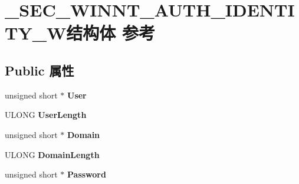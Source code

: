 \hypertarget{struct___s_e_c___w_i_n_n_t___a_u_t_h___i_d_e_n_t_i_t_y___w}{}\section{\+\_\+\+S\+E\+C\+\_\+\+W\+I\+N\+N\+T\+\_\+\+A\+U\+T\+H\+\_\+\+I\+D\+E\+N\+T\+I\+T\+Y\+\_\+\+W结构体 参考}
\label{struct___s_e_c___w_i_n_n_t___a_u_t_h___i_d_e_n_t_i_t_y___w}
\subsection*{Public 属性}
\begin{DoxyCompactItemize}
\item 
\mbox{\label{struct___s_e_c___w_i_n_n_t___a_u_t_h___i_d_e_n_t_i_t_y___w_a8e8608657aa4cf4a42331ae98327e2c1}} 
unsigned short $\ast$ {\bfseries User}
\item 
\mbox{\label{struct___s_e_c___w_i_n_n_t___a_u_t_h___i_d_e_n_t_i_t_y___w_ae8c6f43df6912c76859a0844bc79f59f}} 
U\+L\+O\+NG {\bfseries User\+Length}
\item 
\mbox{\label{struct___s_e_c___w_i_n_n_t___a_u_t_h___i_d_e_n_t_i_t_y___w_a65a44c50b18886d138eb0b67b88473b5}} 
unsigned short $\ast$ {\bfseries Domain}
\item 
\mbox{\label{struct___s_e_c___w_i_n_n_t___a_u_t_h___i_d_e_n_t_i_t_y___w_a36a582765c3655ba2b387477e8abaafb}} 
U\+L\+O\+NG {\bfseries Domain\+Length}
\item 
\mbox{\label{struct___s_e_c___w_i_n_n_t___a_u_t_h___i_d_e_n_t_i_t_y___w_ac469d374c8c00ce025231a2b6573325c}} 
unsigned short $\ast$ {\bfseries Password}
\item 
\mbox{\label{struct___s_e_c___w_i_n_n_t___a_u_t_h___i_d_e_n_t_i_t_y___w_aa706a07b464efb6cf205dfb297109294}} 

\end{DoxyCompactItemize}
